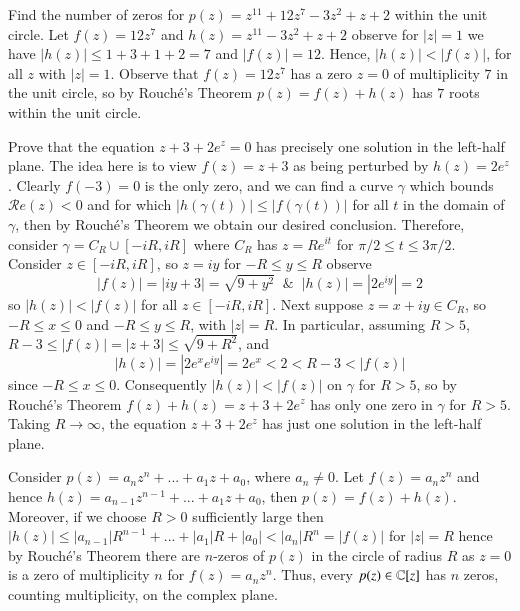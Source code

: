 \begin{example}
    Find the number of zeros for $p(z) = z^{11}+12z^7-3z^2+z+2$ within the unit circle. Let $f(z) = 12z^7$ and $h(z) = z^{11}-3z^2+z+2$ observe for $|z| = 1$ we have $|h(z)| \leq 1+3+1+2 = 7$ and $|f(z)| = 12$. Hence, $|h(z)| < |f(z)|$, for all $z$ with $|z| = 1$. Observe that $f(z) = 12z^7$ has a zero $z = 0$ of multiplicity $7$ in the unit circle, so by Rouch\'{e}'s Theorem $p(z) = f(z)+h(z)$ has $7$ roots within the unit circle.
\end{example}

\begin{example}
    Prove that the equation $z+3+2e^z = 0$ has precisely one solution in the left-half plane. The idea here is to view $f(z) = z+3$ as being perturbed by $h(z) = 2e^z$. Clearly $f(-3) = 0$ is the only zero, and we can find a curve $\gamma$ which bounds $\mathscr{R}e(z) < 0$ and for which $|h(\gamma(t))| \leq |f(\gamma(t))|$ for all $t$ in the domain of $\gamma$, then by Rouch\'{e}'s Theorem we obtain our desired conclusion. Therefore, consider $\gamma = C_R\cup [-iR,iR]$ where $C_R$ has $z = Re^{it}$ for $\pi/2 \leq t \leq 3\pi/2$. Consider $z \in [-iR,iR]$, so $z = iy$ for $-R \leq y \leq R$ observe \begin{equation*}
        |f(z)| = |iy+3| = \sqrt{9+y^2}\;\;\&\;\;|h(z)| = |2e^{iy}| = 2
    \end{equation*}
    so $|h(z)| < |f(z)|$ for all $z \in [-iR,iR]$. Next suppose $z =x+iy \in C_R$, so $-R\leq x \leq 0$ and $-R\leq y \leq R$, with $|z| = R$. In particular, assuming $R > 5$, $R-3\leq |f(z)| = |z+3| \leq \sqrt{9+R^2}$, and $$|h(z)| = |2e^xe^{iy}| = 2e^x < 2 < R-3 < |f(z)|$$ since $-R \leq x \leq 0$. Consequently $|h(z)| < |f(z)|$ on $\gamma$ for $R > 5$, so by Rouch\'{e}'s Theorem $f(z)+h(z) = z+3+2e^z$ has only one zero in $\gamma$ for $R > 5$. Taking $R\rightarrow \infty$, the equation $z+3+2e^z$ has just one solution in the left-half plane.
\end{example}

\begin{example}
    Consider $p(z) = a_nz^n+...+a_1z+a_0$, where $a_n \neq 0$. Let $f(z) = a_nz^n$ and hence $h(z) = a_{n-1}z^{n-1}+...+a_1z+a_0$, then $p(z) = f(z)+h(z)$. Moreover, if we choose $R > 0$ sufficiently large then $|h(z)| \leq |a_{n-1}|R^{n-1} + ... + |a_1|R+|a_0| < |a_n|R^n = |f(z)|$ for $|z| = R$ hence by Rouch\'{e}'s Theorem there are $n$-zeros of $p(z)$ in the circle of radius $R$ as $z = 0$ is a zero of multiplicity $n$ for $f(z) = a_nz^n$. Thus, every $p(z) \in \mathbb C[z]$ has $n$ zeros, counting multiplicity, on the complex plane.
\end{example}


